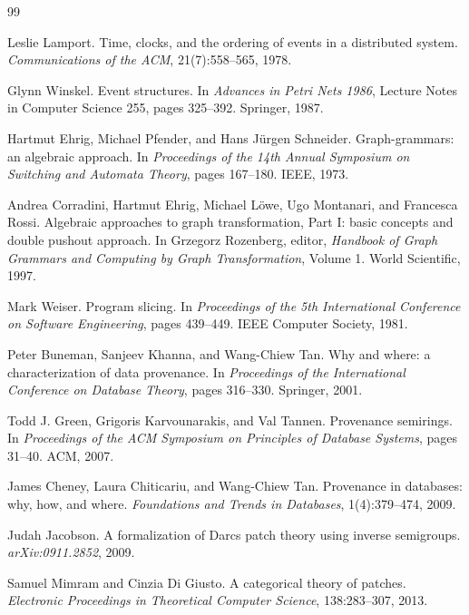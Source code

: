 \documentclass[11pt]{article}
\theoremstyle{definition}
\theoremstyle{plain}
\theoremstyle{remark}
\begin{document}
\begin{thebibliography}{99}

Leslie Lamport.
\newblock Time, clocks, and the ordering of events in a distributed system.
\newblock \textit{Communications of the ACM}, 21(7):558--565, 1978.

Glynn Winskel.
\newblock Event structures.
\newblock In \textit{Advances in Petri Nets 1986}, Lecture Notes in Computer Science 255, pages 325--392. Springer, 1987.

Hartmut Ehrig, Michael Pfender, and Hans Jürgen Schneider.
\newblock Graph-grammars: an algebraic approach.
\newblock In \textit{Proceedings of the 14th Annual Symposium on Switching and Automata Theory}, pages 167--180. IEEE, 1973.

Andrea Corradini, Hartmut Ehrig, Michael Löwe, Ugo Montanari, and Francesca Rossi.
\newblock Algebraic approaches to graph transformation, Part I: basic concepts and double pushout approach.
\newblock In Grzegorz Rozenberg, editor, \textit{Handbook of Graph Grammars and Computing by Graph Transformation}, Volume 1. World Scientific, 1997.

Mark Weiser.
\newblock Program slicing.
\newblock In \textit{Proceedings of the 5th International Conference on Software Engineering}, pages 439--449. IEEE Computer Society, 1981.

Peter Buneman, Sanjeev Khanna, and Wang-Chiew Tan.
\newblock Why and where: a characterization of data provenance.
\newblock In \textit{Proceedings of the International Conference on Database Theory}, pages 316--330. Springer, 2001.

Todd J. Green, Grigoris Karvounarakis, and Val Tannen.
\newblock Provenance semirings.
\newblock In \textit{Proceedings of the ACM Symposium on Principles of Database Systems}, pages 31--40. ACM, 2007.

James Cheney, Laura Chiticariu, and Wang-Chiew Tan.
\newblock Provenance in databases: why, how, and where.
\newblock \textit{Foundations and Trends in Databases}, 1(4):379--474, 2009.

Judah Jacobson.
\newblock A formalization of Darcs patch theory using inverse semigroups.
\newblock \textit{arXiv:0911.2852}, 2009.

Samuel Mimram and Cinzia Di Giusto.
\newblock A categorical theory of patches.
\newblock \textit{Electronic Proceedings in Theoretical Computer Science}, 138:283--307, 2013.


\end{thebibliography}
\end{document}
